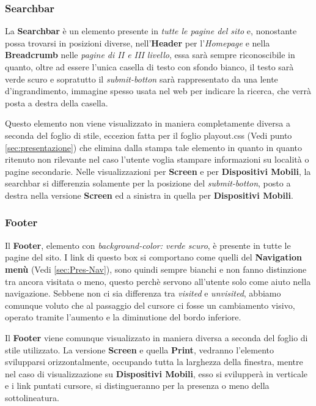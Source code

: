 \subsubsection{Searchbar}\label{sec:Pres-Searchbar}
La \textbf{Searchbar} è un elemento presente in \textit{tutte le pagine del sito} e, nonostante possa trovarsi in posizioni diverse, nell'\textbf{Header} per l'\textit{Homepage} e nella \textbf{Breadcrumb} nelle \textit{pagine di II e III livello}, essa sarà sempre riconoscibile in quanto, oltre ad essere l'unica casella di testo con sfondo bianco, il testo sarà verde scuro e sopratutto il \textit{submit-botton} sarà rappresentato da una lente d'ingrandimento, immagine spesso usata nel web per indicare la ricerca, che verrà posta a destra della casella.

Questo elemento non viene visualizzato in maniera completamente diversa a seconda del foglio di stile, eccezion fatta per il foglio playout.css (Vedi punto \ref{sec:presentazione}) che elimina dalla stampa tale elemento in quanto in quanto ritenuto non rilevante nel caso l'utente voglia stampare informazioni su località o pagine secondarie.
Nelle visualizzazioni per \textbf{Screen} e per \textbf{Dispositivi Mobili}, la searchbar si differenzia solamente per la posizione del \textit{submit-botton}, posto a destra nella versione \textbf{Screen} ed a sinistra in quella per \textbf{Dispositivi Mobili}.

\subsubsection{Footer}\label{sec:Pres-Footer}
Il \textbf{Footer}, elemento con \textit{background-color: verde scuro}, è presente in tutte le pagine del sito. I link di questo box si comportano come quelli del \textbf{Navigation menù} (Vedi \ref{sec:Pres-Nav}), sono quindi sempre bianchi e non fanno distinzione tra ancora visitata o meno, questo perchè servono all'utente solo come aiuto nella navigazione. Sebbene non ci sia differenza tra \textit{visited} e \textit{unvisited}, abbiamo comunque voluto che al passaggio del cursore ci fosse un cambiamento visivo, operato tramite l'aumento e la diminutione del bordo inferiore.

Il \textbf{Footer} viene comunque visualizzato in maniera diversa a seconda del foglio di stile utilizzato. La versione \textbf{Screen} e quella \textbf{Print}, vedranno l'elemento svilupparsi orizzontalmente, occupando tutta la larghezza della finestra, mentre nel caso di visualizzazione su \textbf{Dispositivi Mobili}, esso si svilupperà in verticale e i link puntati cursore, si distingueranno per la presenza o meno della sottolineatura.

